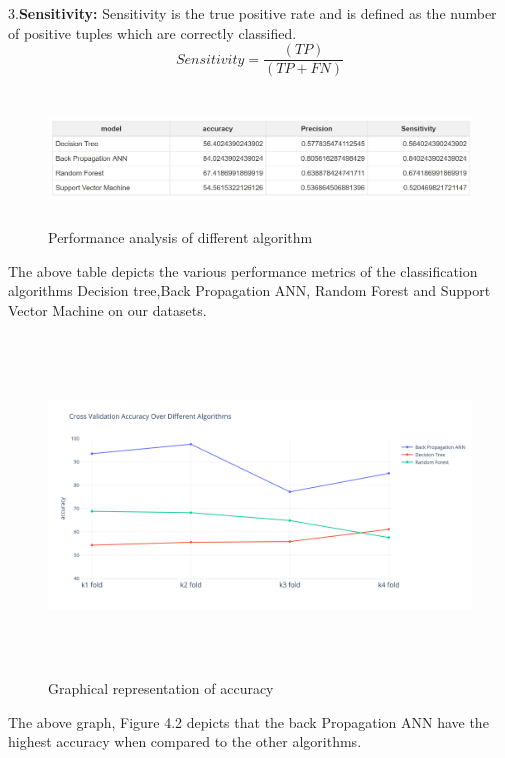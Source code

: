 3.\textbf{Sensitivity:} Sensitivity  is  the  true  positive  rate  and  is  defined  as  the number of positive tuples which are correctly classified.
 \[ Sensitivity=  \frac{(TP)}{(TP+FN)} \]
 
 \pagebreak
 \begin{figure}[H]
\begin{center}
\includegraphics[width=150mm,height=35mm]{comparison/summary.jpg}
 \caption{Performance analysis of different algorithm}
 \end{center}                
\end{figure}
The  above  table  depicts  the  various  performance metrics   of   the   classification   algorithms   Decision   tree,Back Propagation ANN, Random Forest and Support Vector Machine  on our datasets.
\begin{figure}[H]
\begin{center}
\includegraphics[width=150mm,height=90mm]{comparisonnew/accuracy.png}
 \caption{Graphical representation of accuracy}
 \end{center}                
\end{figure}
The above graph, Figure 4.2 depicts that the back Propagation ANN  have  the  highest  accuracy  when  compared  to  the other algorithms.
\pagebreak

